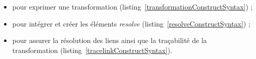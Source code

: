 %
\begin{itemize}

  \item {} pour exprimer une transformation
    (listing~\ref{transformationConstructSyntax}) ;

  \item {} pour intégrer et créer les éléments \emph{resolve}
    (listing~\ref{resolveConstructSyntax}) ;

  \item {} pour assurer la résolution des liens ainsi que la
    traçabilité de la transformation (listing~\ref{tracelinkConstructSyntax}).

\end{itemize}

\begin{figure}[H]
  \centering
  
\end{figure}

\begin{figure}[H]
  \begin{center}
    
  \end{center}
\end{figure}

\begin{figure}[H]
  \begin{center}
    
  \end{center}
\end{figure}


